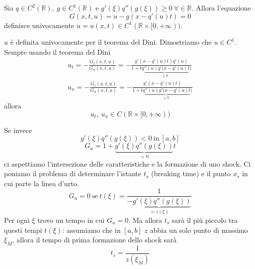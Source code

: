 \documentclass[10pt,a4paper,twoside,openright]{book}
\begin{document}
\begin{theorem}
	Sia $\displaystyle q\in C^{2}(\mathbb{R}) ,\ g\in C^{1}(\mathbb{R})$ e $\displaystyle g'( \xi ) q''( g( \xi )) \geqslant 0\ \forall \in \mathbb{R}$. Allora l'equazione
	\begin{equation*}
		G( x,t,u) =u-g( x-q'( u) t) =0
	\end{equation*}
	definisce univocamente $\displaystyle u=u( x,t) \in C^{1}(\mathbb{R} \times [ 0,+\infty ))$.
\end{theorem}
\begin{dimostrazione}
	$\displaystyle u$ è definita univocamente per il teorema del Dini. Dimostriamo che $\displaystyle u\in C^{1}$. Sempre usando il teorema del Dini
	\begin{gather*}
		u_{t} =-\frac{G_{t}( x,t,u)}{G_{u}( x,t,u)} =-\frac{g'( x-q'( u) t) q'( u)}{1+\underbrace{tq''( u) g'( x-q'( u) t}_{\geqslant 0})}\\
		u_{x} =-\frac{G_{t}( x,t,u)}{G_{u}( x,t,u)} =-\frac{g'( x-q'( u) t)}{1+\underbrace{tq''( u) g'( x-q'( u) t}_{\geqslant 0})}
	\end{gather*}
	allora
	\begin{equation*}
		u_{t} ,\ u_{x} \in C(\mathbb{R} \times [ 0,+\infty ))
	\end{equation*}
\end{dimostrazione}
Se invece
\begin{equation*}
	g'( \xi ) q''( g( \xi )) < 0\ \text{in} \ [ a,b]
\end{equation*}
\begin{equation*}
	G_{u} =1+\underbrace{g'( \xi ) q''( g( \xi ))}_{< 0} t
\end{equation*}
ci aspettiamo l'intersezione delle caratteristiche e la formazione di uno shock. Ci poniamo il problema di determinare l'istante $\displaystyle t_{s}$ (breaking time) e il punto $\displaystyle x_{s}$ in cui parte la linea d'urto.
\begin{equation*}
	G_{u} =0\ \text{se} \ t( \xi ) =\frac{1}{\underbrace{-g'( \xi ) q''( g( \xi ))}_{=z( \xi )}}
\end{equation*}
Per ogni $\displaystyle \xi $ trovo un tempo in cui $\displaystyle G_{u} =0$. Ma allora $\displaystyle t_{s}$ sarà il più piccolo tra questi tempi $\displaystyle t( \xi )$: assumiamo che in $\displaystyle [ a,b]$ $\displaystyle z$ abbia un solo punto di massimo $\displaystyle \xi _{M}$, allora il tempo di prima formazione dello shock sarà
\begin{equation*}
	t_{s} =\frac{1}{z( \xi _{M})}
\end{equation*}
\end{document}
